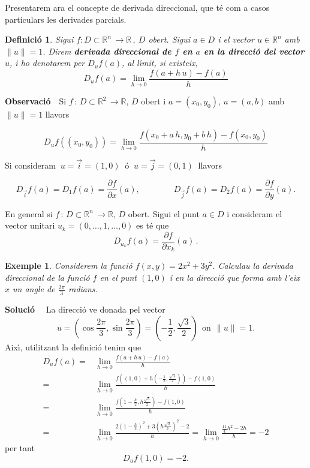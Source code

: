 \documentclass[12pt]{article}
\newcommand{\observacio}{\textbf{Observaci{\'o}}\ \ }
\newcommand{\solucio}{\textbf{Soluci{\'o}}\ \ }
\newtheorem{definicio}{Definici{\'o}}[subsection]
\newtheorem{exemple}{Exemple}[subsection]
\newcommand{\R}{\mathbb{R}}
\begin{document}
Presentarem ara el concepte de derivada direccional, que t{\'e} com a casos particulars les derivades parcials.

\vspace{0.4cm}
\begin{definicio}
Sigui $f: D\subset\R^n\, \longrightarrow\R\,,\ D$ obert. Sigui
$a\in D$ i el vector $u\in\R^n$ amb $\| u\| =1$.
Direm \textbf{derivada direccional de $f$ en $a$ en la direcci{\'o}
del vector $u$}, i ho denotarem per $D_u f(a)$, al
l{\'\i}mit, si existeix,
\[
D_u f(a) =\lim_{h\to 0}\frac{f(a+h\, u)-f(a)}{h}
\]
\end{definicio}

\observacio Si $f\, :\, D\subset\R^2\, \longrightarrow\R$, $D$ obert i $a=(x_0,y_0)$, $u=(a,b)$ amb $\| u\| =1$ llavors

\[
D_u f((x_0,y_0))=\lim_{h\to 0} \frac{f(x_0+a\,h,y_0+b\,h)-f(x_0,y_0)}{h}
\]

Si consideram $\ u=\overrightarrow{i}=(1,0)\ $ {\'o} $\ u=
\overrightarrow{j}=(0,1)\ $ llavors

\[
D_{\overrightarrow{i}}f(a)=D_1f(a)=\frac{\partial f}{\partial
x}(a),\qquad\qquad D_{\overrightarrow{j}}f(a)=D_2f(a)=\frac{\partial f}{\partial
y}(a).
\]

En general si $f\, :\, D\subset\R^n\, \longrightarrow\R$, $D$ obert. Sigui
el punt $a\in D$ i consideram el vector unitari $u_k =
(0,\ldots,  1,\ldots ,0)$ es t{\'e} que
\[
D_{u_k}f(a)=\frac{\partial f}{\partial
x_k}(a)\,.
\]


\vspace{0.4cm}
\begin{exemple}\label{exempderdir}
Considerem la funci{\'o} $f(x,y)=2x^2+3y^2$. Calculau la derivada direccional de la funci{\'o} $f$ en el punt $(1,0)$ i en la direcci{\'o} que forma amb l'eix $x$ un angle de $\frac{2\pi}{3}$ radians.
\end{exemple}

\solucio
La direcci{\'o} ve donada pel vector
\[
u=\left(\cos \frac{2\pi}{3},\sin \frac{2\pi}{3}\right )=\left(-\frac{1}{2},\frac{\sqrt{3}}{2}\right)\,\;
\mbox{on}\ \ \| u\| =1.
\]
Aix{\'\i}, utilitzant la definici{\'o} tenim que
\vspace{0.4cm}\begin{align*}
  D_uf(a) = & \lim_{h\to 0}\frac{f(a+h\, u)-f(a)}{h}  \\
   = & \lim_{h\to 0}\frac{f((1,0) +h
   (-\frac{1}{2},\frac{\sqrt{3}}{2}))-f(1,0)}{h}\\
   = &  \lim_{h\to 0} \frac{f(1-\frac{h}{2},h
   \frac{\sqrt{3}}{2})-f(1,0)}{h} \\
   = &  \lim_{h\to 0} \frac{2 (1-\frac{h}{2} )^2 + 3 (h \frac{\sqrt{3}}{2} )^2 -2 }{h}
  =  \lim_{h\to 0} \frac{\frac{11}{4}h^2 - 2h}{h}=-2
\end{align*}
per tant
\[
D_uf(1,0)=-2.
\]
\end{document}
